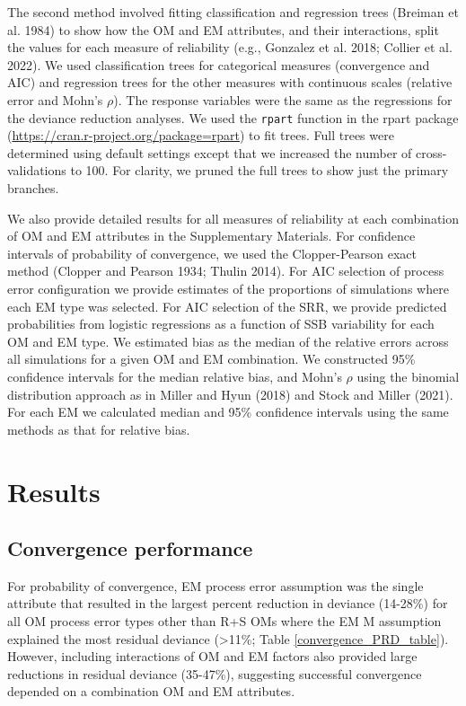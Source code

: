\documentclass[
  12pt,
]{article}
\begin{document}
The second method involved fitting classification and regression trees
(Breiman et al. 1984) to show how the OM and EM attributes, and their
interactions, split the values for each measure of reliability (e.g.,
Gonzalez et al. 2018; Collier et al. 2022). We used classification trees
for categorical measures (convergence and AIC) and regression trees for
the other measures with continuous scales (relative error and Mohn's
\(\rho\)). The response variables were the same as the regressions for
the deviance reduction analyses. We used the \verb|rpart| function in
the rpart package (\url{https://cran.r-project.org/package=rpart}) to
fit trees. Full trees were determined using default settings except that
we increased the number of cross-validations to 100. For clarity, we
pruned the full trees to show just the primary branches.

We also provide detailed results for all measures of reliability at each
combination of OM and EM attributes in the Supplementary Materials. For
confidence intervals of probability of convergence, we used the
Clopper-Pearson exact method (Clopper and Pearson 1934; Thulin 2014).
For AIC selection of process error configuration we provide estimates of
the proportions of simulations where each EM type was selected. For AIC
selection of the SRR, we provide predicted probabilities from logistic
regressions as a function of SSB variability for each OM and EM type. We
estimated bias as the median of the relative errors across all
simulations for a given OM and EM combination. We constructed 95\%
confidence intervals for the median relative bias, and Mohn's \(\rho\)
using the binomial distribution approach as in Miller and Hyun (2018)
and Stock and Miller (2021). For each EM we calculated median and 95\%
confidence intervals using the same methods as that for relative bias.

\section*{Results}\label{results}

\subsection*{Convergence performance}\label{convergence-performance}

For probability of convergence, EM process error assumption was the
single attribute that resulted in the largest percent reduction in
deviance (14-28\%) for all OM process error types other than R+S OMs
where the EM M assumption explained the most residual deviance
(\textgreater11\%; Table \ref{convergence_PRD_table}). However,
including interactions of OM and EM factors also provided large
reductions in residual deviance (35-47\%), suggesting successful
convergence depended on a combination OM and EM attributes.
\end{document}
